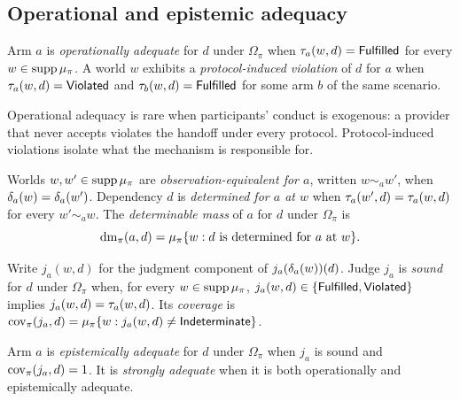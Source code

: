 \subsection{Operational and epistemic adequacy}

\begin{definition}
\label{def:opadeq}
Arm $a$ is \emph{operationally adequate} for $d$ under $\Omega_\pi$ when $\tau_a(w, d) = \mathsf{Fulfilled}$ for every $w \in \operatorname{supp}\mu_\pi$. A world $w$ exhibits a \emph{protocol-induced violation} of $d$ for $a$ when $\tau_a(w,d) = \mathsf{Violated}$ and $\tau_b(w,d) = \mathsf{Fulfilled}$ for some arm $b$ of the same scenario.
\end{definition}

Operational adequacy is rare when participants' conduct is exogenous: a provider that never accepts violates the handoff under every protocol. Protocol-induced violations isolate what the mechanism is responsible for.

\begin{definition}
\label{def:det}
Worlds $w, w' \in \operatorname{supp}\mu_\pi$ are \emph{observation-equivalent for $a$}, written $w \sim_a w'$, when $\delta_a(w) = \delta_a(w')$. Dependency $d$ is \emph{determined for $a$ at $w$} when $\tau_a(w', d) = \tau_a(w, d)$ for every $w' \sim_a w$. The \emph{determinable mass} of $a$ for $d$ under $\Omega_\pi$ is
\[
\operatorname{dm}_\pi(a, d) = \mu_\pi\{ w : d \text{ is determined for } a \text{ at } w \}.
\]
\end{definition}

\begin{definition}
\label{def:sound}
Write $j_a(w,d)$ for the judgment component of $j_a(\delta_a(w))(d)$. Judge $j_a$ is \emph{sound} for $d$ under $\Omega_\pi$ when, for every $w \in \operatorname{supp}\mu_\pi$, $j_a(w,d) \in \{\mathsf{Fulfilled}, \mathsf{Violated}\}$ implies $j_a(w,d) = \tau_a(w,d)$. Its \emph{coverage} is $\operatorname{cov}_\pi(j_a, d) = \mu_\pi\{ w : j_a(w,d) \neq \mathsf{Indeterminate} \}$.
\end{definition}

\begin{definition}
\label{def:epadeq}
Arm $a$ is \emph{epistemically adequate} for $d$ under $\Omega_\pi$ when $j_a$ is sound and $\operatorname{cov}_\pi(j_a, d) = 1$. It is \emph{strongly adequate} when it is both operationally and epistemically adequate.
\end{definition}

